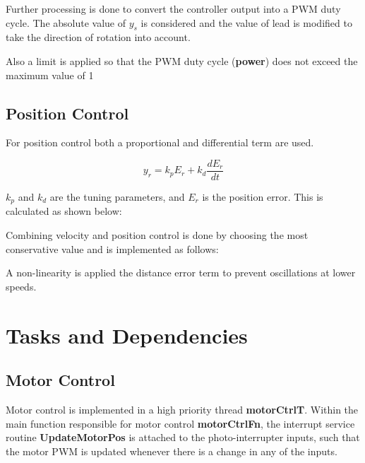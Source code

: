 \documentclass{article}
\begin{document}
\bigskip




\bigskip

\noindent
Further processing is done to convert the controller output into a PWM duty cycle. The absolute value of \(y_s\) is considered and the value of lead is modified to take the direction of rotation into account.

\bigskip



\bigskip

\noindent
Also a limit is applied so that the PWM duty cycle (\textbf{power}) does not exceed the maximum value of 1

\bigskip



\bigskip

\subsection{Position Control}

\noindent
For position control both a proportional and differential term are used.

\[y_r = k_pE_r + k_d \frac{dE_r}{dt}\]

\(k_p\) and \(k_d\) are the tuning parameters, and \(E_r\) is the position error. This is calculated as shown below:

\bigskip

\bigskip

\noindent
Combining velocity and position control is done by choosing the most conservative value and is implemented as follows:

\bigskip

\bigskip

\noindent
A non-linearity is applied the distance error term to prevent oscillations at lower speeds.

\section{Tasks and Dependencies}
\subsection{Motor Control}

\noindent
Motor control is implemented in a high priority thread \textbf{motorCtrlT}. Within the main function responsible for motor control \textbf{motorCtrlFn}, the interrupt service routine \textbf{UpdateMotorPos} is attached to the photo-interrupter inputs, such that the motor PWM is updated whenever there is a change in any of the inputs.
\end{document}
